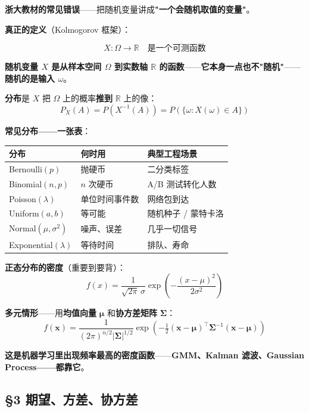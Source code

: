 \textbf{浙大教材的常见错误}——把随机变量讲成\textbf{"一个会随机取值的变量"}。

\textbf{真正的定义}（Kolmogorov 框架）：

\begin{equation}
X: \Omega \to \mathbb{R} \quad \text{是一个可测函数}
\end{equation}

\textbf{随机变量 $X$ 是从样本空间 $\Omega$ 到实数轴 $\mathbb{R}$ 的函数}——\textbf{它本身一点也不"随机"}——\textbf{随机的是输入 $\omega$}。

\textbf{分布}是 $X$ 把 $\Omega$ 上的概率\textbf{推到} $\mathbb{R}$ 上的像：
\[
P_X(A) = P(X^{-1}(A)) = P(\{\omega: X(\omega) \in A\})
\]

\textbf{常见分布——一张表}：

\begin{center}
\begin{tabular}{l|l|l}
\textbf{分布} & \textbf{何时用} & \textbf{典型工程场景} \\
\hline
Bernoulli$(p)$ & 抛硬币 & 二分类标签 \\
Binomial$(n,p)$ & $n$ 次硬币 & A/B 测试转化人数 \\
Poisson$(\lambda)$ & 单位时间事件数 & 网络包到达 \\
Uniform$(a,b)$ & 等可能 & 随机种子 / 蒙特卡洛 \\
Normal$(\mu,\sigma^2)$ & 噪声、误差 & 几乎一切信号 \\
Exponential$(\lambda)$ & 等待时间 & 排队、寿命 \\
\end{tabular}
\end{center}

\textbf{正态分布的密度}（重要到要背）：
\begin{equation}
f(x) = \frac{1}{\sqrt{2\pi}\,\sigma}\exp\!\left(-\frac{(x-\mu)^2}{2\sigma^2}\right)
\end{equation}

\textbf{多元情形}——用\textbf{均值向量} $\bm{\mu}$ 和\textbf{协方差矩阵} $\bm{\Sigma}$：
\begin{equation}
f(\bm{x}) = \frac{1}{(2\pi)^{n/2}|\bm{\Sigma}|^{1/2}}\exp\!\left(-\tfrac{1}{2}(\bm{x}-\bm{\mu})^\top\bm{\Sigma}^{-1}(\bm{x}-\bm{\mu})\right)
\end{equation}

\textbf{这是机器学习里出现频率最高的密度函数}——\textbf{GMM、Kalman 滤波、Gaussian Process——都靠它}。

\subsection{§3 期望、方差、协方差}

